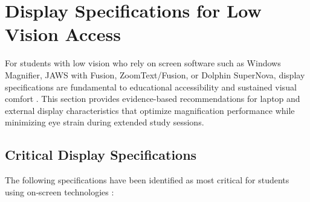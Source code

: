 \chapter{Display Specifications for Low Vision Access}\label{sec:display-specifications-low-vision}


For students with low vision who rely on screen  software such as Windows Magnifier, JAWS with Fusion, ZoomText/Fusion, or Dolphin SuperNova, display specifications are fundamental to educational accessibility and sustained visual comfort \supercite{LowVisionMagnificationNeeds2025,DisplayErgonomicsReview2024}. This section provides evidence-based recommendations for laptop and external display characteristics that optimize magnification performance while minimizing eye strain during extended study sessions.

\section{Critical Display Specifications}

The following specifications have been identified as most critical for students using on‑screen  technologies \supercite{CriticalDisplaySpecsStudy2024,MagnifierPerformanceMetrics2025}:

